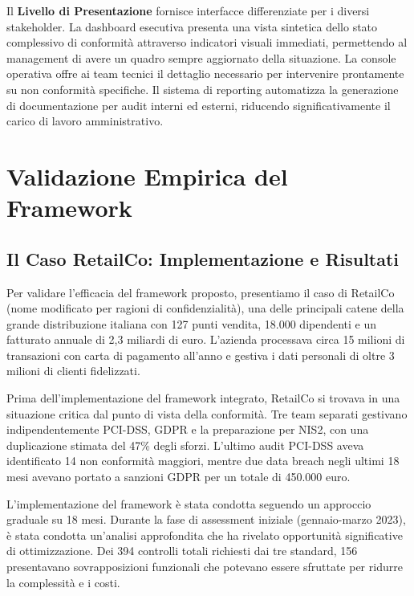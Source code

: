 Il \textbf{Livello di Presentazione} fornisce interfacce differenziate per i diversi stakeholder. La dashboard esecutiva presenta una vista sintetica dello stato complessivo di conformità attraverso indicatori visuali immediati, permettendo al management di avere un quadro sempre aggiornato della situazione. La console operativa offre ai team tecnici il dettaglio necessario per intervenire prontamente su non conformità specifiche. Il sistema di reporting automatizza la generazione di documentazione per audit interni ed esterni, riducendo significativamente il carico di lavoro amministrativo.

\section{Validazione Empirica del Framework}
\label{sec:4.4_validazione}

\subsection{Il Caso RetailCo: Implementazione e Risultati}
\label{subsec:4.4.1_retailco}

Per validare l'efficacia del framework proposto, presentiamo il caso di RetailCo (nome modificato per ragioni di confidenzialità), una delle principali catene della grande distribuzione italiana con 127 punti vendita, 18.000 dipendenti e un fatturato annuale di 2,3 miliardi di euro. L'azienda processava circa 15 milioni di transazioni con carta di pagamento all'anno e gestiva i dati personali di oltre 3 milioni di clienti fidelizzati.

Prima dell'implementazione del framework integrato, RetailCo si trovava in una situazione critica dal punto di vista della conformità. Tre team separati gestivano indipendentemente PCI-DSS, GDPR e la preparazione per NIS2, con una duplicazione stimata del 47\% degli sforzi. L'ultimo audit PCI-DSS aveva identificato 14 non conformità maggiori, mentre due data breach negli ultimi 18 mesi avevano portato a sanzioni GDPR per un totale di 450.000 euro.

L'implementazione del framework è stata condotta seguendo un approccio graduale su 18 mesi. Durante la fase di assessment iniziale (gennaio-marzo 2023), è stata condotta un'analisi approfondita che ha rivelato opportunità significative di ottimizzazione. Dei 394 controlli totali richiesti dai tre standard, 156 presentavano sovrapposizioni funzionali che potevano essere sfruttate per ridurre la complessità e i costi.

